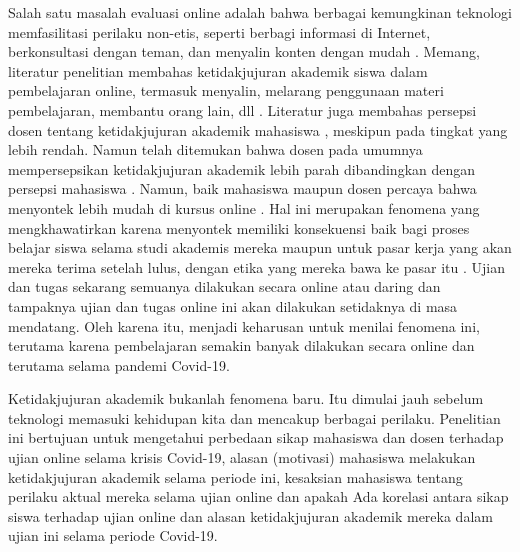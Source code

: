 Salah satu masalah evaluasi online adalah bahwa berbagai kemungkinan teknologi memfasilitasi perilaku non-etis, seperti berbagi informasi di Internet, berkonsultasi dengan teman, dan menyalin konten dengan mudah \citet{peytcheva2018impact} \citet{sarwar2018paid}. Memang, literatur penelitian membahas ketidakjujuran akademik siswa dalam pembelajaran online, termasuk menyalin, melarang penggunaan materi pembelajaran, membantu orang lain, dll \citet{ahmed2018student} \citet{birks2020managing} \citet{grira2019rationality} \citet{stearns2001student}. Literatur juga membahas persepsi dosen tentang ketidakjujuran akademik mahasiswa \citet{blau2021violation} \citet{pincus2003faculty} \citet{stevens2013promoting}, meskipun pada tingkat yang lebih rendah. Namun telah ditemukan bahwa dosen pada umumnya mempersepsikan ketidakjujuran akademik lebih parah dibandingkan dengan persepsi mahasiswa \citep{blau2021violation} \citep{pincus2003faculty}. Namun, baik mahasiswa maupun dosen percaya bahwa menyontek lebih mudah di kursus online \citet{kennedy2000academic}. Hal ini merupakan fenomena yang mengkhawatirkan karena menyontek memiliki konsekuensi baik bagi proses belajar siswa selama studi akademis mereka maupun untuk pasar kerja yang akan mereka terima setelah lulus, dengan etika yang mereka bawa ke pasar itu \citep{barbaranelli2018machiavellian} \citep{bashir2018development}. Ujian dan tugas sekarang semuanya dilakukan secara online atau daring dan tampaknya ujian dan tugas online ini akan dilakukan setidaknya di masa mendatang. Oleh karena itu, menjadi keharusan untuk menilai fenomena ini, terutama karena pembelajaran semakin banyak dilakukan secara online dan terutama selama pandemi Covid-19.

Ketidakjujuran akademik bukanlah fenomena baru. Itu dimulai jauh sebelum teknologi memasuki kehidupan kita dan mencakup berbagai perilaku. Penelitian ini bertujuan untuk mengetahui perbedaan sikap mahasiswa dan dosen terhadap ujian online selama krisis Covid-19, alasan (motivasi) mahasiswa melakukan ketidakjujuran akademik selama periode ini, kesaksian mahasiswa tentang perilaku aktual mereka selama ujian online dan apakah Ada korelasi antara sikap siswa terhadap ujian online dan alasan ketidakjujuran akademik mereka dalam ujian ini selama periode Covid-19.

